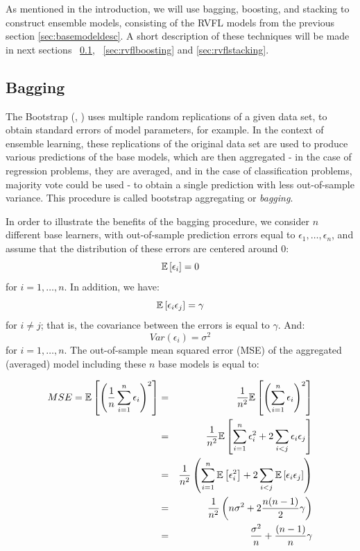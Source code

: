 As mentioned in the introduction, we will use bagging, boosting, and stacking to construct ensemble models, consisting of the RVFL models from the previous section \ref{sec:basemodeldesc}. A short description of these techniques will be made in next sections ~\ref{sec:rvflbagging}, ~\ref{sec:rvflboosting}  and \ref{sec:rvflstacking}.

\subsection{Bagging}
\label{sec:rvflbagging}

The Bootstrap (\cite{efron1986bootstrap}, \cite{efron1992bootstrap}) uses multiple random replications of a given data set, to obtain standard errors of model parameters, for example. In the context of ensemble learning, these replications of the original data set are used to produce various predictions of the base models, which are then aggregated - in the case of regression problems, they are averaged, and in the case of classification problems, majority vote could be used - to obtain a single prediction with less out-of-sample variance. This procedure is called bootstrap aggregating or \textit{bagging}.

\medskip

In order to illustrate the benefits of the bagging procedure, we consider $n$ different base learners, with out-of-sample prediction errors equal to $\epsilon_1, \ldots, \epsilon_n$, and assume that the distribution of these errors are centered around $0$:
$$
\mathbb{E} \left[ \epsilon_i\right] = 0
$$
for $i = 1, \ldots, n$. In addition, we have:
$$
\mathbb{E} \left[ \epsilon_i \epsilon_j\right] = \gamma
$$
for $i \neq j$; that is, the covariance between the errors is equal to $\gamma$. And:
$$
Var(\epsilon_i) = \sigma^2
$$
for $i = 1, \ldots, n$. The out-of-sample mean squared error (MSE) of the aggregated (averaged) model including these $n$ base models is equal to:

\begin{eqnarray*}
MSE = \mathbb{E}\left[ \left( \frac{1}{n} \sum_{i = 1}^n \epsilon_i \right)^2 \right] &=& \frac{1}{n^2} \mathbb{E}\left[ \left( \sum_{i = 1}^n \epsilon_i \right)^2 \right]\\
 &=& \frac{1}{n^2} \mathbb{E}\left[ \sum_{i = 1}^n \epsilon_i^2 + 2 \sum_{i < j} \epsilon_i \epsilon_j  \right]\\
 &=& \frac{1}{n^2} \left( \sum_{i = 1}^n \mathbb{E}\left[\epsilon_i^2\right] + 2 \sum_{i < j} \mathbb{E}\left[\epsilon_i \epsilon_j  \right] \right)\\
 &=& \frac{1}{n^2} \left( n \sigma^2 + 2 \frac{n(n-1)}{2} \gamma \right)\\
 &=& \frac{\sigma^2}{n} + \frac{(n-1)}{n} \gamma \\
\end{eqnarray*}

